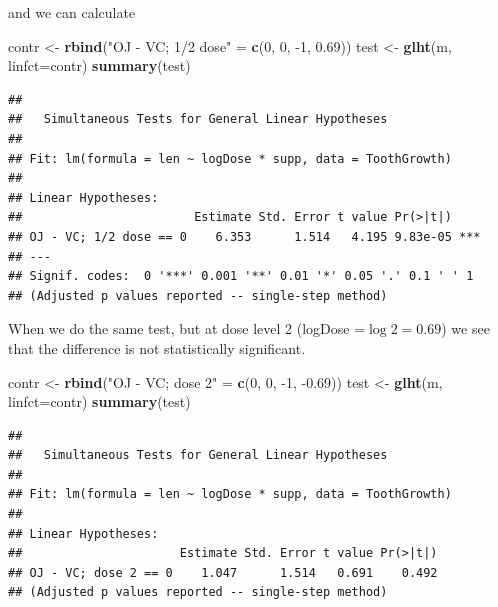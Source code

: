 \documentclass[]{book}
\newenvironment{Shaded}{\begin{snugshade}}{\end{snugshade}}
\newcommand{\KeywordTok}[1]{\textcolor[rgb]{0.13,0.29,0.53}{\textbf{{#1}}}}
\newcommand{\DataTypeTok}[1]{\textcolor[rgb]{0.13,0.29,0.53}{{#1}}}
\newcommand{\DecValTok}[1]{\textcolor[rgb]{0.00,0.00,0.81}{{#1}}}
\newcommand{\FloatTok}[1]{\textcolor[rgb]{0.00,0.00,0.81}{{#1}}}
\newcommand{\StringTok}[1]{\textcolor[rgb]{0.31,0.60,0.02}{{#1}}}
\newcommand{\NormalTok}[1]{{#1}}
\theoremstyle{definition}
\theoremstyle{definition}
\theoremstyle{remark}
\begin{document}
and we can calculate

\begin{Shaded}
\begin{Highlighting}[]
\NormalTok{contr <-}\StringTok{ }\KeywordTok{rbind}\NormalTok{(}\StringTok{"OJ - VC; 1/2 dose"} \NormalTok{=}\StringTok{ }\KeywordTok{c}\NormalTok{(}\DecValTok{0}\NormalTok{, }\DecValTok{0}\NormalTok{, -}\DecValTok{1}\NormalTok{, }\FloatTok{0.69}\NormalTok{))}
\NormalTok{test <-}\StringTok{ }\KeywordTok{glht}\NormalTok{(m, }\DataTypeTok{linfct=}\NormalTok{contr)}
\KeywordTok{summary}\NormalTok{(test)}
\end{Highlighting}
\end{Shaded}

\begin{verbatim}
## 
##   Simultaneous Tests for General Linear Hypotheses
## 
## Fit: lm(formula = len ~ logDose * supp, data = ToothGrowth)
## 
## Linear Hypotheses:
##                        Estimate Std. Error t value Pr(>|t|)    
## OJ - VC; 1/2 dose == 0    6.353      1.514   4.195 9.83e-05 ***
## ---
## Signif. codes:  0 '***' 0.001 '**' 0.01 '*' 0.05 '.' 0.1 ' ' 1
## (Adjusted p values reported -- single-step method)
\end{verbatim}

When we do the same test, but at dose level 2 (logDose =\(\log2=0.69\))
we see that the difference is not statistically significant.

\begin{Shaded}
\begin{Highlighting}[]
\NormalTok{contr <-}\StringTok{ }\KeywordTok{rbind}\NormalTok{(}\StringTok{"OJ - VC; dose 2"} \NormalTok{=}\StringTok{ }\KeywordTok{c}\NormalTok{(}\DecValTok{0}\NormalTok{, }\DecValTok{0}\NormalTok{, -}\DecValTok{1}\NormalTok{, -}\FloatTok{0.69}\NormalTok{))}
\NormalTok{test <-}\StringTok{ }\KeywordTok{glht}\NormalTok{(m, }\DataTypeTok{linfct=}\NormalTok{contr)}
\KeywordTok{summary}\NormalTok{(test)}
\end{Highlighting}
\end{Shaded}

\begin{verbatim}
## 
##   Simultaneous Tests for General Linear Hypotheses
## 
## Fit: lm(formula = len ~ logDose * supp, data = ToothGrowth)
## 
## Linear Hypotheses:
##                      Estimate Std. Error t value Pr(>|t|)
## OJ - VC; dose 2 == 0    1.047      1.514   0.691    0.492
## (Adjusted p values reported -- single-step method)
\end{verbatim}
\end{document}
